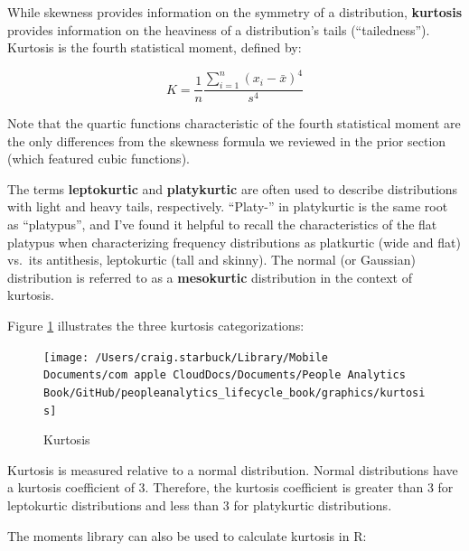 \documentclass[]{book}
\newenvironment{Shaded}{\begin{snugshade}}{\end{snugshade}}
\newcommand{\CommentTok}[1]{\textcolor[rgb]{0.56,0.35,0.01}{\textit{#1}}}
\newcommand{\DecValTok}[1]{\textcolor[rgb]{0.00,0.00,0.81}{#1}}
\newcommand{\KeywordTok}[1]{\textcolor[rgb]{0.13,0.29,0.53}{\textbf{#1}}}
\newcommand{\NormalTok}[1]{#1}
\newcommand{\OperatorTok}[1]{\textcolor[rgb]{0.81,0.36,0.00}{\textbf{#1}}}
\begin{document}
While skewness provides information on the symmetry of a distribution, \textbf{kurtosis} provides information on the heaviness of a distribution's tails (``tailedness''). Kurtosis is the fourth statistical moment, defined by:

\[ K = \frac{1}{n} \frac{\displaystyle\sum_{i=1}^{n} (x_i-\bar{x})^4}{s^4} \]

Note that the quartic functions characteristic of the fourth statistical moment are the only differences from the skewness formula we reviewed in the prior section (which featured cubic functions).

The terms \textbf{leptokurtic} and \textbf{platykurtic} are often used to describe distributions with light and heavy tails, respectively. ``Platy-'' in platykurtic is the same root as ``platypus'', and I've found it helpful to recall the characteristics of the flat platypus when characterizing frequency distributions as platkurtic (wide and flat) vs.~its antithesis, leptokurtic (tall and skinny). The normal (or Gaussian) distribution is referred to as a \textbf{mesokurtic} distribution in the context of kurtosis.

Figure \ref{fig:kurtosis} illustrates the three kurtosis categorizations:

\begin{figure}

{\centering \texttt{[image: /Users/craig.starbuck/Library/Mobile Documents/com~apple~CloudDocs/Documents/People Analytics Book/GitHub/peopleanalytics\_lifecycle\_book/graphics/kurtosis]} 

}

\caption{Kurtosis}\label{fig:kurtosis}
\end{figure}

Kurtosis is measured relative to a normal distribution. Normal distributions have a kurtosis coefficient of 3. Therefore, the kurtosis coefficient is greater than 3 for leptokurtic distributions and less than 3 for platykurtic distributions.

The moments library can also be used to calculate kurtosis in R:

\begin{Shaded}
\end{Shaded}
\end{document}
